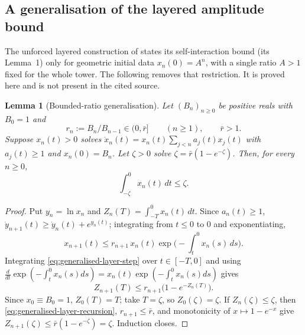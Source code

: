 \documentclass[11pt]{amsart}
\numberwithin{equation}{section}
\theoremstyle{plain}
\newtheorem{lemma}[theorem]{Lemma}
\theoremstyle{definition}
\theoremstyle{remark}
\begin{document}
\subsection{A generalisation of the layered amplitude bound}
\label{subsec:generalised-lemma}

The unforced layered construction of \cite{CordobaMartinezZoroaZheng2023}
states its self-interaction bound (its Lemma~1) only for geometric initial
data $x_n(0)=A^n$, with a single ratio $A>1$ fixed for the whole tower.  The
following removes that restriction.  It is proved here and is not present in
the cited source.

\begin{lemma}[Bounded-ratio generalisation]
\label{lem:generalised-layer-bound}
Let $(B_n)_{n\ge0}$ be positive reals with $B_0=1$ and
\begin{equation}
r_n:=B_n/B_{n-1}\in(0,\bar r]\qquad(n\ge1),\qquad\bar r>1.
\label{eq:ratio-range}
\end{equation}
Suppose $x_n(t)>0$ solves $\dot x_n(t)=x_n(t)\sum_{j<n}a_j(t)x_j(t)$ with
$a_j(t)\ge1$ and $x_n(0)=B_n$.  Let $\zeta>0$ solve $\zeta=\bar r(1-e^{-\zeta})$.
Then, for every $n\ge0$,
\begin{equation}
\int_{-\zeta}^0x_n(t)\,dt\le\zeta.
\label{eq:generalised-layer-bound}
\end{equation}
\end{lemma}

\begin{proof}
Put $y_n=\ln x_n$ and $Z_n(T)=\int_{-T}^0x_n(t)\,dt$.  Since $a_n(t)\ge1$,
$\dot y_{n+1}(t)\ge\dot y_n(t)+e^{y_n(t)}$; integrating from $t\le0$ to $0$
and exponentiating,
\begin{equation}
x_{n+1}(t)\le r_{n+1}\,x_n(t)\exp\Big(-\int_t^0x_n(s)\,ds\Big).
\label{eq:generalised-layer-step}
\end{equation}
Integrating \eqref{eq:generalised-layer-step} over $t\in[-T,0]$ and using
$\frac{d}{dt}\exp(-\int_t^0x_n(s)ds)=x_n(t)\exp(-\int_t^0x_n(s)ds)$ gives
\begin{equation}
Z_{n+1}(T)\le r_{n+1}\big(1-e^{-Z_n(T)}\big).
\label{eq:generalised-layer-recursion}
\end{equation}
Since $x_0\equiv B_0=1$, $Z_0(T)=T$; take $T=\zeta$, so $Z_0(\zeta)=\zeta$.
If $Z_n(\zeta)\le\zeta$, then \eqref{eq:generalised-layer-recursion},
$r_{n+1}\le\bar r$, and monotonicity of $x\mapsto1-e^{-x}$ give
$Z_{n+1}(\zeta)\le\bar r(1-e^{-\zeta})=\zeta$.  Induction closes.
\end{proof}
\end{document}

